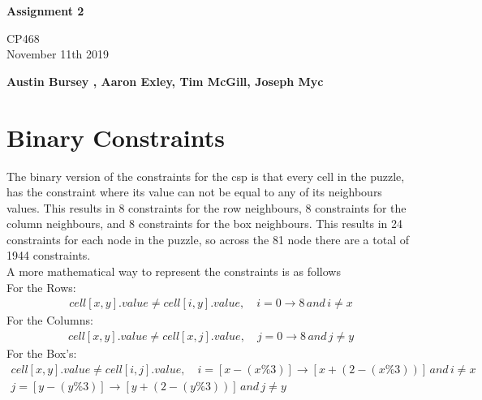 \documentclass{article}
\begin{document}
\begin{titlepage}
  \pagestyle{fancy}
  \thispagestyle{fancy}
   \begin{center}
       \vspace*{1cm}
 
      \Huge
       \textbf{Assignment 2}
 
       \vspace{0.5cm}
       \Large
        CP468 \\ November 11th 2019
 
       \vspace{1.5cm}
 
       \textbf{Austin Bursey , Aaron Exley, Tim McGill, Joseph Myc}
 
       \vfill

       \vspace{0.8cm}
 
   \end{center}
\end{titlepage}
\setcounter{page}{2}

\section{Binary Constraints}
The binary version of the constraints for the csp is that every cell in the puzzle, has the constraint where its value can not be equal to any of its neighbours  values. This results in 8 constraints for the row neighbours, 8 constraints for the column neighbours, and 8 constraints for the box neighbours. This results in 24 constraints for each node in the puzzle, so across the 81 node there are a total of 1944 constraints.\\
\newline
A more mathematical way to represent the constraints is as follows\\
For the Rows:
\begin{align*}
cell[x, y].value \ne cell[i, y].value,\quad i=0\rightarrow8\,and\, i \ne x
\end{align*}
For the Columns:
\begin{align*}
cell[x, y].value \ne cell[x, j].value,\quad j=0\rightarrow8\,and\, j \ne y
\end{align*}
For the Box's:
\begin{align*}
cell[x, y].value \ne cell[i, j].value,\quad i=[x-(x\%3)]\rightarrow[x+(2-(x\%3))]\,and\, i \ne x \\
												j=[y-(y\%3)]\rightarrow[y+(2-(y\%3))]\, and\, j \ne y
\end{align*}
\end{document}
